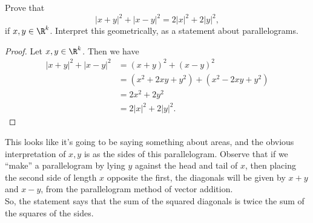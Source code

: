 \documentclass{assignment}
\begin{document}
\begin{question}[17]
  Prove that $$|x + y|^2 + |x - y|^2 = 2|x|^2 + 2|y|^2,$$ if $x,y\in\R^k$. Interpret this geometrically,
  as a statement about parallelograms.
\end{question}
\begin{proof}
  Let $x,y\in\R^k$. Then we have
  \begin{align*}
    |x+y|^2 + |x-y|^2 &= (x+y)^2 + (x-y)^2 \\
                      &= (x^2 + 2xy + y^2) + (x^2 - 2xy + y^2) \\
                      &= 2x^2 + 2y^2 \\
                      &= 2|x|^2 + 2|y|^2.
  \end{align*}
\end{proof}
This looks like it's going to be saying something about areas, and the obvious interpretation of $x,y$ 
is as the sides of this parallelogram. Observe that if we ``make'' a parallelogram by lying $y$ against
the head and tail of $x$, then placing the second side of length $x$ opposite the first, the diagonals
will be given by $x + y$ and $x - y$, from the parallelogram method of vector addition. \\

So, the statement says that the sum of the squared diagonals is twice the sum of the squares of the sides.
\end{document}
